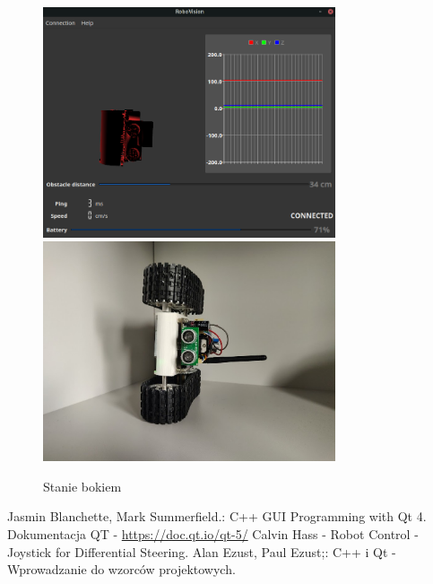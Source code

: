 \documentclass[12pt,a4paper,polish]{article}
\begin{document}
  \begin{figure}[h]
    \centering
    \includegraphics[width=0.77\textwidth]{img/final/4.png}
    \includegraphics[width=0.77\textwidth]{img/final/4e.jpg}
    \caption{Stanie bokiem}
    \label{fig:test4}
  \end{figure}

  \newpage

  \begin{thebibliography}{99}
    \bibitem{} Jasmin Blanchette, Mark Summerfield.: C++ GUI Programming with Qt 4.
    \bibitem{} Dokumentacja QT -  \url{https://doc.qt.io/qt-5/}
    \bibitem{} Calvin Hass - Robot Control - Joystick for Differential Steering.
    \bibitem{} Alan Ezust, Paul Ezust;: C++ i Qt - Wprowadzanie do wzorców projektowych.
  \end{thebibliography}
\end{document}
